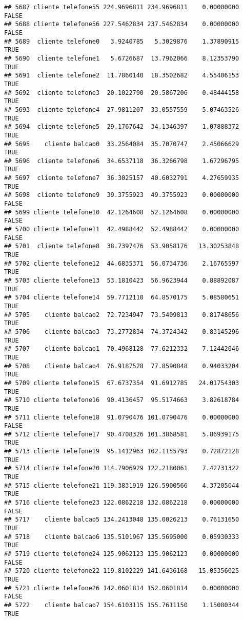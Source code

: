 \documentclass[
]{article}
\begin{document}
\begin{verbatim}
## 5687 cliente telefone55 224.9696811 234.9696811    0.00000000    FALSE
## 5688 cliente telefone56 227.5462834 237.5462834    0.00000000    FALSE
## 5689  cliente telefone0   3.9240785   5.3029876    1.37890915     TRUE
## 5690  cliente telefone1   5.6726687  13.7962066    8.12353790     TRUE
## 5691  cliente telefone2  11.7860140  18.3502682    4.55406153     TRUE
## 5692  cliente telefone3  20.1022790  20.5867206    0.48444158     TRUE
## 5693  cliente telefone4  27.9811207  33.0557559    5.07463526     TRUE
## 5694  cliente telefone5  29.1767642  34.1346397    1.07888372     TRUE
## 5695    cliente balcao0  33.2564084  35.7070747    2.45066629     TRUE
## 5696  cliente telefone6  34.6537118  36.3266798    1.67296795     TRUE
## 5697  cliente telefone7  36.3025157  40.6032791    4.27659935     TRUE
## 5698  cliente telefone9  39.3755923  49.3755923    0.00000000    FALSE
## 5699 cliente telefone10  42.1264608  52.1264608    0.00000000    FALSE
## 5700 cliente telefone11  42.4988442  52.4988442    0.00000000    FALSE
## 5701  cliente telefone8  38.7397476  53.9058176   13.30253848     TRUE
## 5702 cliente telefone12  44.6835371  56.0734736    2.16765597     TRUE
## 5703 cliente telefone13  53.1810423  56.9623944    0.88892087     TRUE
## 5704 cliente telefone14  59.7712110  64.8570175    5.08580651     TRUE
## 5705    cliente balcao2  72.7234947  73.5409813    0.81748656     TRUE
## 5706    cliente balcao3  73.2772834  74.3724342    0.83145296     TRUE
## 5707    cliente balcao1  70.4968128  77.6212332    7.12442046     TRUE
## 5708    cliente balcao4  76.9187528  77.8590848    0.94033204     TRUE
## 5709 cliente telefone15  67.6737354  91.6912785   24.01754303     TRUE
## 5710 cliente telefone16  90.4136457  95.5174663    3.82618784     TRUE
## 5711 cliente telefone18  91.0790476 101.0790476    0.00000000    FALSE
## 5712 cliente telefone17  90.4708326 101.3868581    5.86939175     TRUE
## 5713 cliente telefone19  95.1412963 102.1155793    0.72872128     TRUE
## 5714 cliente telefone20 114.7906929 122.2180061    7.42731322     TRUE
## 5715 cliente telefone21 119.3831919 126.5900566    4.37205044     TRUE
## 5716 cliente telefone23 122.0862218 132.0862218    0.00000000    FALSE
## 5717    cliente balcao5 134.2413048 135.0026213    0.76131650     TRUE
## 5718    cliente balcao6 135.5101967 135.5695000    0.05930333     TRUE
## 5719 cliente telefone24 125.9062123 135.9062123    0.00000000    FALSE
## 5720 cliente telefone22 119.8102229 141.6436168   15.05356025     TRUE
## 5721 cliente telefone26 142.0601814 152.0601814    0.00000000    FALSE
## 5722    cliente balcao7 154.6103115 155.7611150    1.15080344     TRUE

\end{verbatim}
\end{document}
